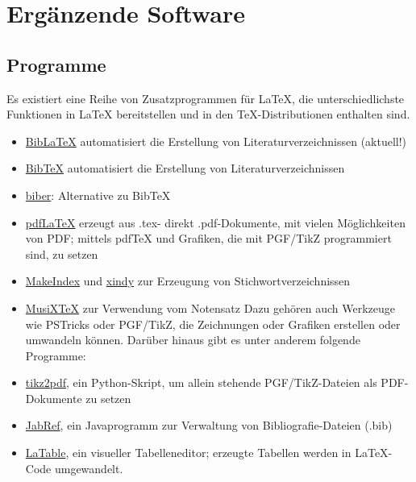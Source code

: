 
\section{Ergänzende Software}
\subsection{Programme}
Es existiert eine Reihe von Zusatzprogrammen für LaTeX, die unterschiedlichste Funktionen in LaTeX bereitstellen und in den TeX-Distributionen enthalten sind.
\begin{itemize}
	\item \href{https://de.wikipedia.org/w/index.php?title=BibLaTeX&action=edit&redlink=1}{BibLaTeX} automatisiert die Erstellung von Literaturverzeichnissen (aktuell!)
	\item \href{https://de.wikipedia.org/wiki/BibTeX}{BibTeX} automatisiert die Erstellung von Literaturverzeichnissen
	\item \href{https://de.wikipedia.org/w/index.php?title=Biber_(Software)&action=edit&redlink=1}{biber}: Alternative zu BibTeX
	\item \href{https://de.wikipedia.org/wiki/PdfLaTeX}{pdfLaTeX} erzeugt aus .tex- direkt .pdf-Dokumente, mit vielen Möglichkeiten von PDF; mittels pdfTeX und Grafiken, die mit PGF/TikZ programmiert sind, zu setzen
	\item \href{https://de.wikipedia.org/wiki/MakeIndex}{MakeIndex} und \href{https://de.wikipedia.org/w/index.php?title=Xindy&action=edit&redlink=1}{xindy} zur Erzeugung von Stichwortverzeichnissen
	\item \href{https://de.wikipedia.org/wiki/MusiXTeX}{MusiXTeX} zur Verwendung vom Notensatz
	Dazu gehören auch Werkzeuge wie PSTricks oder PGF/TikZ, die Zeichnungen oder Grafiken erstellen oder umwandeln können. Darüber hinaus gibt es unter anderem folgende Programme:
	\item \href{https://de.wikipedia.org/w/index.php?title=Tikz2pdf&action=edit&redlink=1}{tikz2pdf}, ein Python-Skript, um allein stehende PGF/TikZ-Dateien als PDF-Dokumente zu setzen
	\item \href{https://de.wikipedia.org/wiki/JabRef}{JabRef}, ein Javaprogramm zur Verwaltung von Bibliografie-Dateien (.bib)
	\item \href{https://de.wikipedia.org/w/index.php?title=LaTable&action=edit&redlink=1}{LaTable}, ein visueller Tabelleneditor; erzeugte Tabellen werden in LaTeX-Code umgewandelt.
	
\end{itemize}

